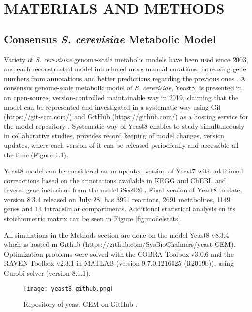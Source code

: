 \chapter{MATERIALS AND METHODS}

\section{Consensus \emph{S. cerevisiae} Metabolic Model}
Variety of \emph{S. cerevisiae} genome-scale metabolic models have been used since 2003, and each reconstructed model introduced more manual curations, increasing gene numbers from annotations and better predictions regarding the previous ones \cite{lopes2017genome}. A consensus genome-scale metabolic model of \emph{S. cerevisiae}, Yeast8, is presented in an open-source, version-controlled maintainable way in 2019, claiming that the model can be represented and investigated in a systematic way using Git (https://git-scm.com/) and GitHub (https://github.com/) as a hosting service for the model repository \cite{lu2019consensus}. Systematic way of Yeast8 enables to study simultaneously in collaborative studies, provides record keeping of model changes, version updates, where each version of it can be released periodically and accessible all the time (Figure \ref{fig:yeast8_github}).

Yeast8 model can be considered as an updated version of Yeast7 \cite{aung2013revising} with additional correactions based on the annotations available in KEGG and ChEBI, and several gene inclusions from the model iSce926 \cite{chowdhury2015using}. Final version of Yeast8 to date, version 8.3.4 released on July 28, has 3991 reactions, 2691 metabolites, 1149 genes and 14 intracellular compartments. Additional statistical analysis on its stoichiometric matrix can be seen in Figure \ref{fig:modelstats}.

All simulations in the Methods section are done on the model Yeast8 v8.3.4 which is hosted in Github (https://github.com/SysBioChalmers/yeast-GEM). Optimization problems were solved with the COBRA Toolbox v3.0.6 and the RAVEN Toolbox v2.3.1 in MATLAB (version 9.7.0.1216025 (R2019b)), using Gurobi solver (version 8.1.1).

\begin{figure}[H]
\begin{center}
\texttt{[image: yeast8\_github.png]}
\end{center}
\caption[Repository of yeast GEM on GitHub]{Repository of yeast GEM on GitHub \cite{lu2019consensus}.}
\label{fig:yeast8_github}
\end{figure}

